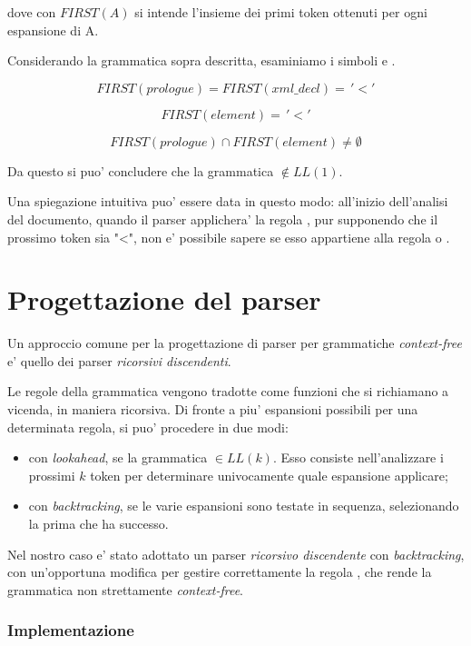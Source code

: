 \documentclass[italian,a4paper]{article}
\begin{document}
dove con $ FIRST(A) $ si intende l'insieme dei primi token ottenuti per ogni
espansione di A.

Considerando la grammatica sopra descritta, esaminiamo i simboli
 e .

\[ FIRST(prologue) = FIRST(xml\_decl) = \, '<' \] 

\[ FIRST(element) = \, '<' \] 

\[ FIRST(prologue) \cap FIRST(element) \neq \emptyset \]

Da questo si puo' concludere che la grammatica $ \notin LL(1) $.

Una spiegazione intuitiva puo' essere data in questo modo: all'inizio
dell'analisi del documento, quando il parser applichera' la regola
, pur supponendo che il prossimo token sia "<", non e'
possibile sapere se esso appartiene alla regola  o
.

\part{Progettazione del parser}

Un approccio comune per la progettazione di parser per grammatiche
\emph{context-free} e' quello dei parser \emph{ricorsivi discendenti}.

Le regole della grammatica vengono tradotte come funzioni che si richiamano a
vicenda, in maniera ricorsiva. Di fronte a piu' espansioni possibili per una
determinata regola, si puo' procedere in due modi:

\begin{itemize}
	\item con \emph{lookahead}, se la grammatica $ \in LL(k) $.
		Esso consiste nell'analizzare i prossimi $ k $ token per
		determinare univocamente quale espansione applicare;

	\item con \emph{backtracking}, se le varie espansioni sono testate in
		sequenza, selezionando la prima che ha successo.
\end{itemize}

Nel nostro caso e' stato adottato un parser \emph{ricorsivo discendente} con
\emph{backtracking}, con un'opportuna modifica per gestire correttamente la
regola , che rende la grammatica non strettamente
\emph{context-free}.

\section{Implementazione}
\end{document}
